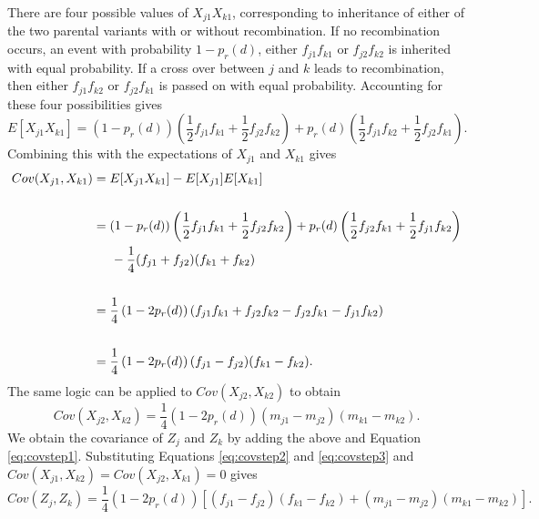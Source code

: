 \documentclass{article}
\begin{document}
There are four possible values of $X_{j1} X_{k1}$, corresponding to inheritance of either of the two parental variants with or without recombination. If no recombination occurs, an event with probability $1 - p_r(d)$, either $f_{j1} f_{k1}$ or $f_{j2} f_{k2}$ is inherited with equal probability. If a cross over between $j$ and $k$ leads to recombination, then either $f_{j1} f_{k2}$ or $f_{j2} f_{k1}$ is passed on with equal probability. Accounting for these four possibilities gives
$$E[X_{j1} X_{k1}] = (1 - p_r(d)) \left ( \frac{1}{2} f_{j1} f_{k1} + \frac{1}{2} f_{j2} f_{k2} \right ) + p_r(d) \left ( \frac{1}{2} f_{j1} f_{k2} + \frac{1}{2} f_{j2} f_{k1} \right ).$$
Combining this with the expectations of $X_{j1}$ and $X_{k1}$ gives
\begin{equation} \label{eq:covstep2}
  \begin{split}
    Cov(X_{j1}, X_{k1}) & = E[X_{j1} X_{k1}] - E[X_{j1}]E[X_{k1}] \\
    & \\
    & = (1 - p_r(d)) \left ( \frac{1}{2} f_{j1} f_{k1} + \frac{1}{2} f_{j2} f_{k2} \right ) + p_r(d) \left ( \frac{1}{2} f_{j2} f_{k1} + \frac{1}{2} f_{j1} f_{k2} \right ) \\
    & \hspace{0.5cm} - \frac{1}{4} (f_{j1} + f_{j2})(f_{k1} + f_{k2}) \\
    & \\
    & = \frac{1}{4} \left ( 1 - 2 p_r(d) \right ) (f_{j1}f_{k1} + f_{j2}f_{k2} - f_{j2}f_{k1} - f_{j1}f_{k2}) \\
    & \\
    & = \frac{1}{4} \left ( 1 - 2 p_r(d) \right ) (f_{j1} - f_{j2})(f_{k1} - f_{k2}) .\\
  \end{split}
\end{equation}
The same logic can be applied to $Cov(X_{j2}, X_{k2})$ to obtain
\begin{equation} \label{eq:covstep3}
  Cov(X_{j2}, X_{k2}) = \frac{1}{4} \left ( 1 - 2 p_r(d) \right ) (m_{j1} - m_{j2})(m_{k1} - m_{k2}).
\end{equation}
We obtain the covariance of $Z_j$ and $Z_k$ by adding the above and Equation \ref{eq:covstep1}. Substituting Equations \ref{eq:covstep2} and \ref{eq:covstep3} and $Cov(X_{j1}, X_{k2}) = Cov(X_{j2}, X_{k1}) = 0$ gives
\begin{equation} \label{eq:cov}
  Cov(Z_j, Z_k) = \frac{1}{4} (1 - 2 p_r(d)) \left [ (f_{j1} - f_{j2})(f_{k1} - f_{k2}) + (m_{j1} - m_{j2})(m_{k1} - m_{k2}) \right ].
\end{equation}
\end{document}

